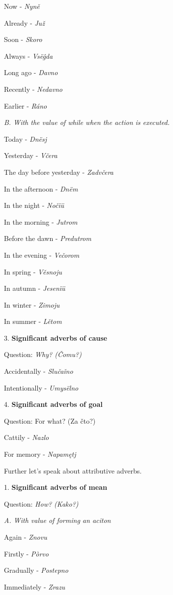 Now - \textit{Nyně}

Already - \textit{Juž}

Soon - \textit{Skoro}

Always - \textit{Vsëĝda}

Long ago - \textit{Davno}

Recently - \textit{Nedavno}

Earlier - \textit{Ráno}

\textit{B. With the value of while when the action is executed.}

Today - \textit{Dnësj}

Yesterday - \textit{Včera}

The day before yesterday - \textit{Zadvčera}

In the afternoon - \textit{Dnëm}

In the night - \textit{Nočïü}

In the morning - \textit{Jutrom}

Before the dawn - \textit{Predutrom}

In the evening - \textit{Večorom}

In spring - \textit{Věsnoju}

In autumn - \textit{Jesenïü}

In winter - \textit{Zimoju}

In summer - \textit{Lětom}

3. \textbf{Significant adverbs of cause}

Question: \textit{Why? (Čomu?)}

Accidentally - \textit{Slučaǐno}

Intentionally - \textit{Umysëlno}

4. \textbf{Significant adverbs of goal}

Question: For what? (Za čto?)

Cattily - \textit{Nazlo}

For memory - \textit{Napamętj}

Further let’s speak about attributive adverbs.

1. \textbf{Significant adverbs of mean}

Question: \textit{How? (Kako?)}

\textit{A. With value of forming an aciton}

Again - \textit{Znovu}

Firstly - \textit{Pòrvo}

Gradually - \textit{Postepno}

Immediately - \textit{Zrazu}


